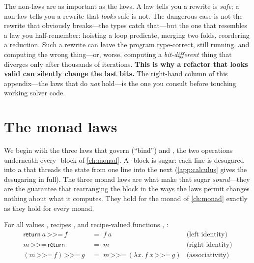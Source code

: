 \begin{keyidea}
The non-laws are as important as the laws. A law tells you a rewrite is \emph{safe};
a non-law tells you a rewrite that \emph{looks} safe is not. The dangerous case is
not the rewrite that obviously breaks---the types catch that---but the one that
resembles a law you half-remember: hoisting a loop predicate, merging two folds,
reordering a reduction. Such a rewrite can leave the program type-correct, still
running, and computing the wrong thing---or, worse, computing a \emph{bit-different}
thing that diverges only after thousands of iterations. \textbf{This is why a
refactor that looks valid can silently change the last bits.} The right-hand column
of this appendix---the laws that do \emph{not} hold---is the one you consult before
touching working solver code.
\end{keyidea}

\section{The monad laws}
\label{sec:cmonad}

We begin with the three laws that govern \code{>>=} (``bind'') and , the
two operations underneath every -block of \cref{ch:monad}. A -block
is sugar: each line is desugared into a \code{>>=} that threads the state from one
line into the next (\cref{app:calculus} gives the desugaring in full). The three
monad laws are what make that sugar \emph{sound}---they are the guarantee that
rearranging the block in the ways the laws permit changes nothing about what it
computes. They hold for the  monad of \cref{ch:monad} exactly as they
hold for every monad.

\begin{theorem}
\label{thm:monad}
For all values , recipes , and recipe-valued functions ,
:
\begin{align}
  \textsf{return}\ a \,\texttt{>>=}\, f
    &\;=\; f\ a
    & \text{(left identity)} \label{eq:leftid}\\[2pt]
  m \,\texttt{>>=}\, \textsf{return}
    &\;=\; m
    & \text{(right identity)} \label{eq:rightid}\\[2pt]
  (m \,\texttt{>>=}\, f) \,\texttt{>>=}\, g
    &\;=\; m \,\texttt{>>=}\, (\lambda x.\, f\ x \,\texttt{>>=}\, g)
    & \text{(associativity)} \label{eq:assoc}
\end{align}
\end{theorem}

